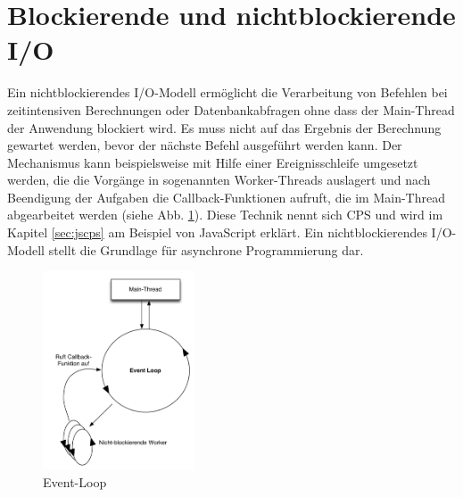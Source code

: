 \section{Blockierende und nichtblockierende \acs{I/O}}
\label{sec:nonblocking}Ein nichtblockierendes I/O-Modell ermöglicht die Verarbeitung von Befehlen bei zeitintensiven Berechnungen oder Datenbankabfragen ohne dass der Main-Thread der Anwendung blockiert wird. Es muss nicht auf das Ergebnis der Berechnung gewartet werden, bevor der nächste Befehl ausgeführt werden kann. Der Mechanismus kann beispielsweise mit Hilfe einer Ereignisschleife umgesetzt werden, die die Vorgänge in sogenannten Worker-Threads auslagert und nach Beendigung der Aufgaben die Callback-Funktionen aufruft, die im Main-Thread abgearbeitet werden (siehe Abb. \ref{fig:nonblocking}). Diese Technik nennt sich \acf{CPS} und wird im Kapitel \ref{sec:jscps} am Beispiel von JavaScript erklärt. Ein nichtblockierendes I/O-Modell stellt die Grundlage für asynchrone Programmierung dar.
\begin{figure}[H]
\centering
\includegraphics[width=0.4\textwidth]{images/nonblocking.png}
\caption[Event-Loop]{Event-Loop}
\label{fig:nonblocking}
\end{figure}
\acresetall

